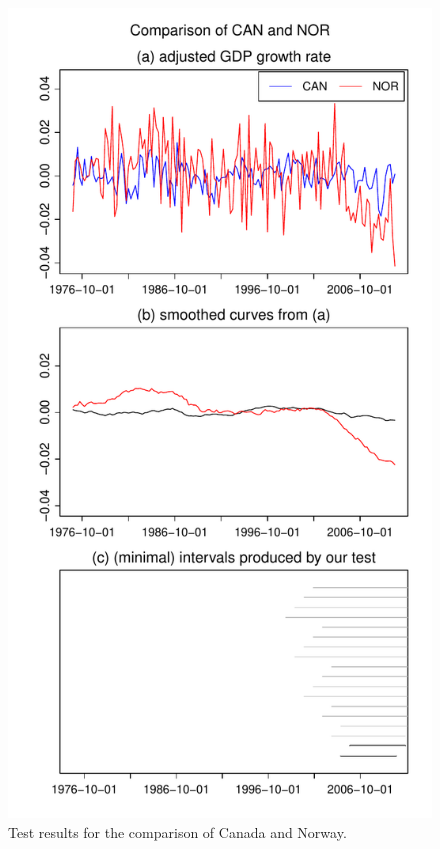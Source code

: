 \documentclass[a4paper,12pt]{article}
\begin{document}
\begin{figure}[t!]
\begin{minipage}[t]{0.49\textwidth}
\includegraphics[width=\textwidth]{output/plots/gdp/CAN_vs_NOR}
\caption{Test results for the comparison of Canada and Norway.}\label{fig:Canada:Norway}
\end{minipage}
\hspace{0.25cm}

\end{figure}
\end{document}
